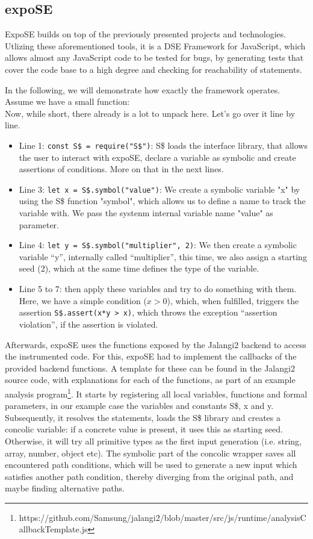 \subsection{expoSE}
\label{sec:expose}
ExpoSE builds on top of the previously presented projects and technologies. Utlizing these aforementioned tools, it is a DSE Framework for JavaScript, which allows almost any JavaScript code to be tested for bugs, by generating tests that cover the code base to a high degree and checking for reachability of statements. \cite{loring_expose_2017}

In the following, we will demonstrate how exactly the framework operates. \\
Assume we have a small function:\\
Now, while short, there already is a lot to unpack here. Let's go over it line by line. 
\begin{itemize}
    \item Line 1: \lstinline{const S$ = require("S$")}: S\$ loads the interface library, that allows the user to interact with expoSE, declare a variable as symbolic and create assertions of conditions. More on that in the next lines.
    \item Line 3: \lstinline{let x = S$.symbol("value")}: We create a symbolic variable "x" by using the S\$ function "symbol", which allows us to define a name to track the variable with. We pass the systenm internal variable name "value" as parameter.  
    \item Line 4: \lstinline{let y = S$.symbol("multiplier", 2)}: We then create a symbolic variable “y”, internally called “multiplier”, this time, we also assign a starting seed (2), which at the same time defines the type of the variable.
    \item Line 5 to 7: then apply these variables and try to do something with them. Here, we have a simple condition ($x > 0$), which, when fulfilled, triggers the assertion \lstinline{S$.assert(x*y > x)}, which throws the exception “assertion violation”, if  the assertion is violated.
\end{itemize}
Afterwards, expoSE uses the functions exposed by the Jalangi2 backend  to access the instrumented code. For this, expoSE had to implement the callbacks of the provided backend functions. A template for these can be found in the Jalangi2 source code, with explanations for each of the functions, as part of an example analysis program\footnote{https://github.com/Samsung/jalangi2/blob/master/src/js/runtime/analysisCallbackTemplate.js}. 
It starts by registering all local variables, functions and formal parameters, in our example case the variables and constants S\$, x and y. Subsequently, it resolves the statements, loads the S\$ library and creates a concolic variable: if a concrete value is present, it uses this as starting seed. Otherwise, it will try all primitive types as the first input generation (i.e. string, array, number, object etc). The symbolic part of the concolic wrapper saves all encountered path conditions, which will be used to generate a new input which satisfies another path condition, thereby diverging from the original path, and maybe finding alternative paths.
